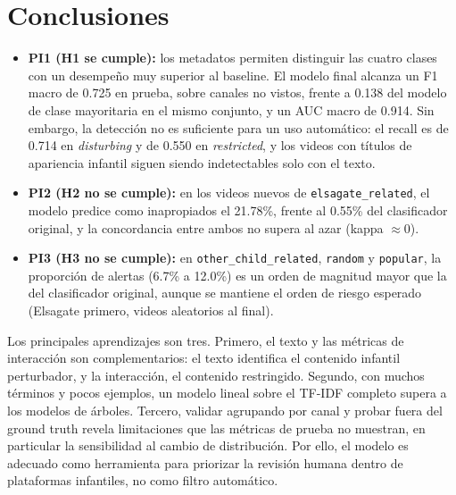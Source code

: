 \documentclass[conference]{IEEEtran}
\begin{document}
\section{Conclusiones}\label{sec:conclusiones}
\begin{itemize}
\item \textbf{PI1 (H1 se cumple):} los metadatos permiten distinguir las cuatro clases con un desempeño muy superior al baseline. El modelo final alcanza un F1 macro de 0.725 en prueba, sobre canales no vistos, frente a 0.138 del modelo de clase mayoritaria en el mismo conjunto, y un AUC macro de 0.914. Sin embargo, la detección no es suficiente para un uso automático: el recall es de 0.714 en \textit{disturbing} y de 0.550 en \textit{restricted}, y los videos con títulos de apariencia infantil siguen siendo indetectables solo con el texto.
\item \textbf{PI2 (H2 no se cumple):} en los videos nuevos de \texttt{elsagate\_related}, el modelo predice como inapropiados el 21.78\%, frente al 0.55\% del clasificador original, y la concordancia entre ambos no supera al azar (kappa $\approx 0$).
\item \textbf{PI3 (H3 no se cumple):} en \texttt{other\_child\_related}, \texttt{random} y \texttt{popular}, la proporción de alertas (6.7\% a 12.0\%) es un orden de magnitud mayor que la del clasificador original, aunque se mantiene el orden de riesgo esperado (Elsagate primero, videos aleatorios al final).
\end{itemize}
Los principales aprendizajes son tres. Primero, el texto y las métricas de interacción son complementarios: el texto identifica el contenido infantil perturbador, y la interacción, el contenido restringido. Segundo, con muchos términos y pocos ejemplos, un modelo lineal sobre el TF-IDF completo supera a los modelos de árboles. Tercero, validar agrupando por canal y probar fuera del ground truth revela limitaciones que las métricas de prueba no muestran, en particular la sensibilidad al cambio de distribución. Por ello, el modelo es adecuado como herramienta para priorizar la revisión humana dentro de plataformas infantiles, no como filtro automático.
\end{document}
